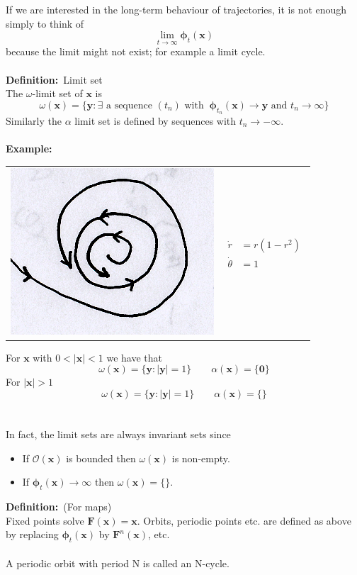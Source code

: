 \documentclass{article}
\newcommand{\cO}{\mathcal{O}}                               %
\newcommand{\example}{\textbf{Example:}}                    %
\newcommand{\definition}{\textbf{Definition:}}              %
\newcommand{\bp}{\bm{\phi}}                                 %
\begin{document}
\noindent If we are interested in the long-term behaviour of trajectories, it is not 
enough simply to think of 
\[ \lim_{t \to \infty} \bp_t(\bm{x}) \]
because the limit might not exist; for example a limit cycle.
\\
\\
\definition\ Limit set
\\
The $\omega$-limit set of $\bm{x}$ is 
\[ \omega (\bm{x}) = \{ \bm{y} : \exists \mbox{ a sequence } (t_n) \mbox{ with }\
 \bp_{t_n}(\bm{x}) \to \bm{y} \mbox{ and } t_n \to \infty \} \]
Similarly the $\alpha$ limit set is defined by sequences with $t_n \to - \infty$.
\\
\\
\example\ \\
%
\begin{center}
\begin{tabular}{ m{4.5cm} m{4.5cm}  }\centering 
\includegraphics[scale = 0.35]{fig4.png}  & 
$ \begin{array}{rl}
\dot{r} &= r(1-r^2) \\
\dot{\theta} &= 1
 \end{array}$
\end{tabular} 
\end{center}
%
For $\bm{x}$ with $0 < |\bm{x}| < 1$ we have that
\[ \omega ( \bm{x} ) = \{ \bm{y} : |\bm{y}| = 1 \}  \qquad  \alpha ( \bm{x} ) = \{\bm{0} \} \]
For $|\bm{x}|>1$
\[ \omega ( \bm{x} ) = \{ \bm{y} : |\bm{y}| = 1 \}  \qquad  \alpha ( \bm{x} ) = \{ \} \]
\\
\\
In fact, the limit sets are always invariant sets since
\begin{itemize}
\item If $\cO(\bm{x})$ is bounded then $\omega(\bm{x})$ is non-empty.
\item If $\bp_t(\bm{x}) \to \infty$ then $\omega(\bm{x}) = \{ \} $.
\end{itemize}\vspace{3mm}
\definition\ (For maps) 
\\
Fixed points solve $\bm{F}(\bm{x}) = \bm{x}$. Orbits, periodic points etc.
are defined as above by replacing $\bp_t(\bm{x})$ by $\bm{F}^n(\bm{x})$,
etc.
\\
\\
A periodic orbit with period N is called an N-cycle.
\end{document}
